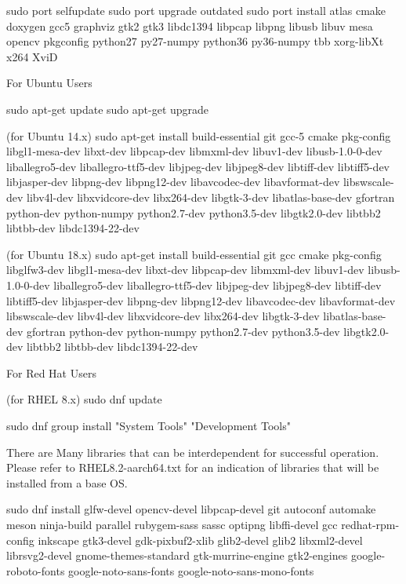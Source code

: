 \begin{DoxyCode}
sudo port selfupdate
sudo port upgrade outdated
sudo port install atlas cmake doxygen gcc5 graphviz gtk2 gtk3 libdc1394 libpcap libpng libusb libuv mesa
       opencv pkgconfig python27 py27-numpy python36 py36-numpy tbb xorg-libXt x264 XviD
\end{DoxyCode}
 For Ubuntu Users 
\begin{DoxyCode}
sudo apt-get update
sudo apt-get upgrade

(for Ubuntu 14.x)
sudo apt-get install build-essential git gcc-5 cmake pkg-config libgl1-mesa-dev libxt-dev libpcap-dev
       libmxml-dev libuv1-dev libusb-1.0-0-dev liballegro5-dev liballegro-ttf5-dev libjpeg-dev libjpeg8-dev libtiff-dev
       libtiff5-dev libjasper-dev libpng-dev libpng12-dev libavcodec-dev libavformat-dev libswscale-dev libv4l-dev
       libxvidcore-dev libx264-dev libgtk-3-dev libatlas-base-dev gfortran python-dev python-numpy python2.7-dev
       python3.5-dev libgtk2.0-dev libtbb2 libtbb-dev libdc1394-22-dev

(for Ubuntu 18.x)
sudo apt-get install build-essential git gcc cmake pkg-config libglfw3-dev libgl1-mesa-dev libxt-dev
       libpcap-dev libmxml-dev libuv1-dev libusb-1.0-0-dev liballegro5-dev liballegro-ttf5-dev libjpeg-dev libjpeg8-dev
       libtiff-dev libtiff5-dev libjasper-dev libpng-dev libpng12-dev libavcodec-dev libavformat-dev libswscale-dev
       libv4l-dev libxvidcore-dev libx264-dev libgtk-3-dev libatlas-base-dev gfortran python-dev python-numpy
       python2.7-dev python3.5-dev libgtk2.0-dev libtbb2 libtbb-dev libdc1394-22-dev
\end{DoxyCode}
 For Red Hat Users 
\begin{DoxyCode}
(for RHEL 8.x)
sudo dnf update

sudo dnf group install "System Tools" "Development Tools"

There are Many libraries that can be interdependent for successful operation. Please refer to
       RHEL8.2-aarch64.txt for an indication of libraries that will be installed from a base OS.

sudo dnf install glfw-devel opencv-devel libpcap-devel git autoconf automake meson ninja-build parallel
       rubygem-sass sassc optipng libffi-devel gcc redhat-rpm-config inkscape gtk3-devel gdk-pixbuf2-xlib glib2-devel
       glib2 libxml2-devel librsvg2-devel gnome-themes-standard gtk-murrine-engine gtk2-engines google-roboto-fonts
       google-noto-sans-fonts google-noto-sans-mono-fonts
\end{DoxyCode}


